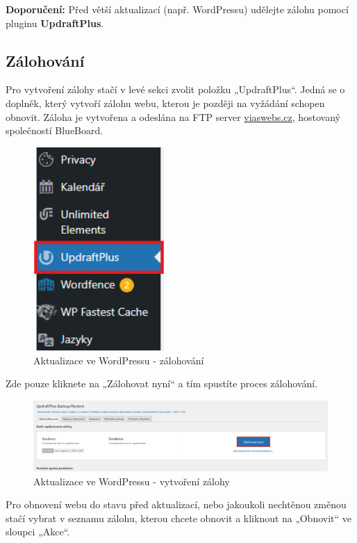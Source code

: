\documentclass[12pt,a4paper]{article}
\begin{document}
	\textbf{Doporučení:} Před větší aktualizací (např. WordPressu) udělejte zálohu pomocí pluginu \textbf{UpdraftPlus}.
	
	\subsection{Zálohování}
	Pro vytvoření zálohy stačí v levé sekci zvolit položku „UpdraftPlus“. Jedná se o doplněk, který vytvoří zálohu webu, kterou je později na vyžádání schopen obnovit. Záloha je vytvořena a odeslána na FTP server \url{viaswebs.cz}, hostovaný společností BlueBoard.
	
	\newpage
	\begin{figure}[htp]
		\centering
		\includegraphics[width=5cm]{WPbackupmenu}
		\caption{Aktualizace ve WordPressu - zálohování}
		\label{fig:role}
	\end{figure}
	
	Zde pouze kliknete na „Zálohovat nyní“ a tím spustíte proces zálohování.
	
	\begin{figure}[htp]
		\centering
		\includegraphics[width=17cm]{WPmakebackup}
		\caption{Aktualizace ve WordPressu - vytvoření zálohy}
		\label{fig:role}
	\end{figure}
	
	Pro obnovení webu do stavu před aktualizací, nebo jakoukoli nechtěnou změnou stačí vybrat v seznamu zálohu, kterou chcete obnovit a kliknout na „Obnovit“ ve sloupci „Akce“.
	
\end{document}
